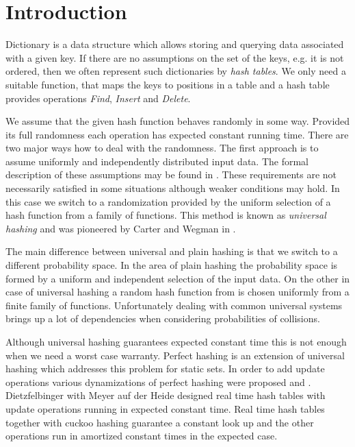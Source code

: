 \section{Introduction}
Dictionary is a data structure which allows storing and querying data associated with a given key. If there are no assumptions on the set of the keys, e.g. it is not ordered, then we often represent such dictionaries by \emph{hash tables}. We only need a suitable function, that maps the keys to positions in a table and a hash table provides operations \emph{Find}, \emph{Insert} and \emph{Delete}. 

We assume that the given hash function behaves randomly in some way. Provided its full randomness each operation has expected constant running time. There are two major ways how to deal with the randomness. The first approach is to assume uniformly and independently distributed input data. The formal description of these assumptions may be found in \cite{DBLP:books/sp/Mehlhorn84}. These requirements are not necessarily satisfied in some situations although weaker conditions may hold. In this case we switch to a randomization provided by the uniform selection of a hash function from a family of functions. This method is known as \emph{universal hashing} and was pioneered by Carter and Wegman in \cite{DBLP:journals/jcss/CarterW79}. 

The main difference between universal and plain hashing is that we switch to a different probability space. In the area of plain hashing the probability space is formed by a uniform and independent selection of the input data. On the other in case of universal hashing a random hash function from is chosen uniformly from a finite family of functions. Unfortunately dealing with common universal systems brings up a lot of dependencies when considering probabilities of collisions.

Although universal hashing guarantees expected constant time this is not enough when we need a worst case warranty. Perfect hashing \cite{Fredman:1984:SST:828.1884} is an extension of universal hashing which addresses this problem for static sets. In order to add update operations various dynamizations of perfect hashing were proposed \cite{DBLP:journals/siamcomp/DietzfelbingerKMHRT94} and \cite{DBLP:conf/icalp/DietzfelbingerH90}. Dietzfelbinger with Meyer auf der Heide designed real time hash tables \cite{DBLP:conf/icalp/DietzfelbingerH90} with update operations running in expected constant time. Real time hash tables together with cuckoo hashing \cite{DBLP:conf/esa/PaghR01} guarantee a constant look up and the other operations run in amortized constant times in the expected case.

